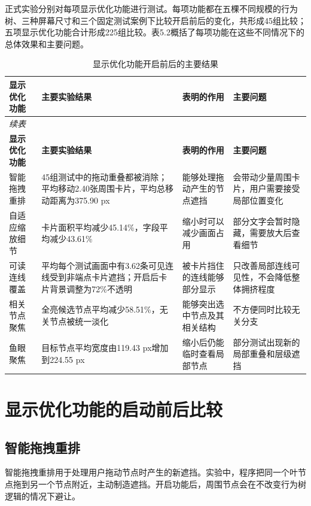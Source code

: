 \documentclass[11pt,a4paper,oneside,extrafontsizes]{memoir}
\begin{document}
正式实验分别对每项显示优化功能进行测试。每项功能都在五棵不同规模的行为树、三种屏幕尺寸和三个固定测试案例下比较开启前后的变化，共形成45组比较；五项显示优化功能合计形成225组比较。表5.2概括了每项功能在这些不同情况下的总体效果和主要问题。

\begin{center}

\begin{longtable}{@{}p{} p{} p{} p{}@{}}
\caption{显示优化功能开启前后的主要结果}\label{tab:display-main-results}\\
\toprule
\textbf{显示优化功能} & \textbf{主要实验结果} & \textbf{表明的作用} & \textbf{主要问题} \\
\midrule
\endfirsthead
\multicolumn{4}{l}{\itshape 续表}\\
\toprule
\textbf{显示优化功能} & \textbf{主要实验结果} & \textbf{表明的作用} & \textbf{主要问题} \\
\midrule
\endhead
智能拖拽重排 & 45组测试中的拖动重叠都被消除；平均移动2.40张周围卡片，平均总移动距离为375.90 px & 能够处理拖动产生的节点遮挡 & 会带动少量周围卡片，用户需要接受局部位置变化 \\
自适应缩放细节 & 卡片面积平均减少45.14\%，字段平均减少43.61\% & 缩小时可以减少画面占用 & 部分文字会暂时隐藏，需要放大后查看细节 \\
可读连线覆盖 & 平均每个测试画面中有3.62条可见连线受到非端点卡片遮挡；开启后卡片背景调整为72\%不透明 & 被卡片挡住的连线能够部分显示 & 只改善局部连线可见性，不会降低整体拥挤程度 \\
相关节点聚焦 & 全亮候选节点平均减少58.51\%，无关节点被统一淡化 & 能够突出选中节点及其相关结构 & 不方便同时比较无关分支 \\
鱼眼聚焦 & 目标节点平均宽度由119.43 px增加到224.55 px & 缩小后仍能临时查看局部节点 & 部分测试出现新的局部重叠和层级遮挡 \\
\bottomrule
\end{longtable}
\end{center}

\section{显示优化功能的启动前后比较}

\subsection{智能拖拽重排}

智能拖拽重排用于处理用户拖动节点时产生的新遮挡。实验中，程序把同一个叶节点拖到另一个节点附近，主动制造遮挡。开启功能后，周围节点会在不改变行为树逻辑的情况下避让。
\end{document}
